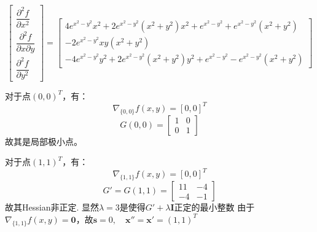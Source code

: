 \documentclass[UTF8]{ctexart}
\begin{document}
\begin{enumerate}
\begin{equation}
\begin{bmatrix}
\dfrac {\partial ^{2}f}{\partial x^{2}}\\
\dfrac {\partial ^{2}f}{\partial x\partial y}\\
\dfrac {\partial ^{2}f}{\partial y^{2}}
\end{bmatrix}
=
\begin{bmatrix}
 4 e^{x^2-y^2} x^2+2 e^{x^2-y^2} \left(x^2+y^2\right) x^2+e^{x^2-y^2}+e^{x^2-y^2} \left(x^2+y^2\right) \\ 
 -2 e^{x^2-y^2} x y \left(x^2+y^2\right) \\ -4 e^{x^2-y^2} y^2+2 e^{x^2-y^2} \left(x^2+y^2\right) y^2+e^{x^2-y^2}-e^{x^2-y^2} \left(x^2+y^2\right)\end{bmatrix}
 \end{equation}

对于点$(0,0)^T$，有：
\[\nabla _{\{0,0\}}f(x,y)=[0,0]^T\]
\[G(0,0)=\begin{bmatrix}
1&0\\
0&1
\end{bmatrix}\]
故其是局部极小点。

对于点$(1,1)^T$，有：
\[\nabla _{\{1,1\}}f(x,y)=[0,0]^T\]
\[G'=G(1,1)=\begin{bmatrix}
11&-4\\
-4&-1
\end{bmatrix}\]
故其Hessian非正定.
显然$\lambda=3$是使得$G'+\lambda \bm{I}$正定的最小整数
由于$\nabla _{\{1,1\}}f(x,y)=\bm{0}$，故$\bm{s}=0,\quad \bm{x}''=\bm{x}'=(1,1)^T$

\end{enumerate}
\end{document}
